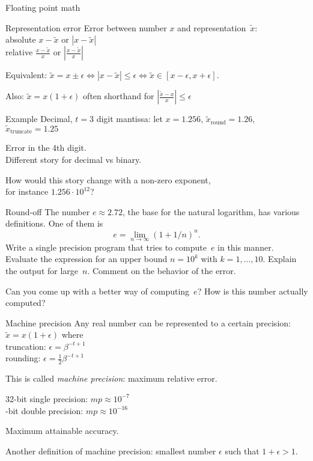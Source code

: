  {Floating point math}

\begin{numberedframe}{Representation error}
Error between number $x$ and representation~$\tilde x$:\\
absolute $x-\tilde x$ or $|x-\tilde x|$\\
relative $\frac{x-\tilde x}{x}$ or $\left|\frac{x-\tilde x}{x}\right|$

Equivalent: $\tilde x=x\pm\epsilon\Leftrightarrow |x-\tilde
x|\leq\epsilon \Leftrightarrow \tilde x\in[x-\epsilon,x+\epsilon]$.

Also: $\tilde x =x(1+\epsilon)$ often shorthand for
$\left|\frac{\tilde x-x}{x}\right|\leq \epsilon$
\end{numberedframe}

\begin{numberedframe}{Example}
Decimal, $t=3$ digit mantissa: let $x=1.256$, $\tilde
x_{\mathrm{round}}=1.26$, $\tilde x_{\mathrm{truncate}}=1.25$

Error in the 4th digit.\\
Different story for decimal vs binary.

How would this story change with a non-zero exponent,\\
for instance $1.256\cdot 10^{12}$?
\end{numberedframe}

\begin{exercise}{Round-off}
  The number $e\approx 2.72$, the base for the natural logarithm, has
  various definitions. One of them is 
  \[ e=\lim_{n\rightarrow\infty} (1+1/n)^n. \]
  Write a single precision program that tries to compute~$e$ in this
  manner. Evaluate the expression for an upper bound $n=10^k$ with
  $k=1,\ldots,10$. Explain the output for large~$n$. Comment on the
  behavior of the error.

  Can you come up with a better way of computing~$e$?
  How is this number actually computed?
\end{exercise}
\begin{answer}
\end{answer}

\begin{numberedframe}{Machine precision}
  Any real number can be represented to a certain precision:
  $\tilde x=x(1+\epsilon)$ where\\
  truncation: $\epsilon=\beta^{-t+1}$\\
  rounding: $\epsilon=\frac12 \beta^{-t+1}$

  This is called \emph{machine precision}: maximum relative error.

  32-bit single precision: $mp\approx10^{-7}$\\ -bit double precision: $mp\approx10^{-16}$
  
  Maximum attainable accuracy.
  
  Another definition of machine precision: smallest number $\epsilon$ such that
  $1+\epsilon>1$.
\end{numberedframe}

